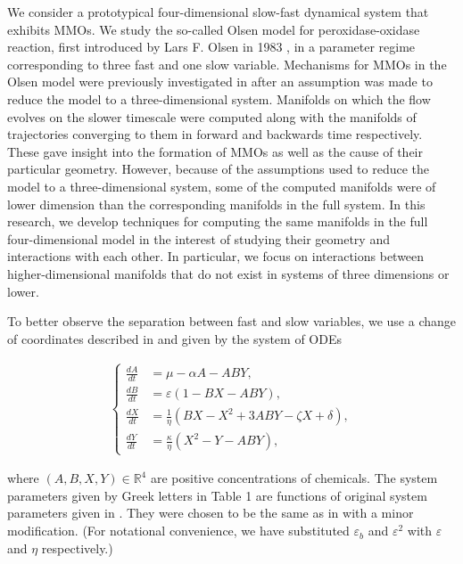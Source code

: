 \documentclass{ws-ijbc}
\begin{document}
We consider a prototypical four-dimensional slow-fast dynamical system that exhibits MMOs.  We study the so-called Olsen model for peroxidase-oxidase reaction, first introduced by Lars F. Olsen in 1983  \cite{Olsen}, in a parameter regime corresponding to three fast and one slow variable.  Mechanisms for MMOs in the Olsen model were previously investigated in \cite{QSSA} after an assumption was made to reduce the model to a three-dimensional system.  Manifolds on which the flow evolves on the slower timescale were computed along with the manifolds of trajectories converging to them in forward and backwards time respectively.  These gave insight into the formation of MMOs as well as the cause of their particular geometry.  However, because of the assumptions used to reduce the model to a three-dimensional system, some of the computed manifolds were of lower dimension than the corresponding manifolds in the full system.  In this research, we develop techniques for computing the same manifolds in the full four-dimensional model in the interest of studying their geometry and interactions with each other.  In particular, we focus on interactions between higher-dimensional manifolds that do not exist in systems of three dimensions or lower.


To better observe the separation between fast and slow variables, we use a change of coordinates described in \cite{Rescaling} and given by the system of ODEs
    
\begin{equation}
\begin{aligned}
\begin{cases}
\frac{dA}{dt} &= \mu - \alpha A - ABY, \\
\frac{dB}{dt} &= \varepsilon(1-BX - ABY), \\
\frac{dX}{dt} &= \frac{1}{\eta}(BX - X^2 +3ABY - \zeta X + \delta), \\
\frac{dY}{dt} &= \frac{\kappa}{\eta}(X^2 - Y - ABY),
\end{cases}
\end{aligned}
\label{equation_1}
\end{equation}
    
\noindent
where $(A, B, X, Y)\in\mathbb{R}^{4}$ are positive concentrations of chemicals.  The system parameters given by Greek letters in Table 1 are functions of original system parameters given in \cite{Olsen}. They were chosen to be the same as in \cite{Rescaling} with a minor modification.  (For notational convenience, we have substituted  $\varepsilon_{b}$ and $\varepsilon^{2}$ with $\varepsilon$ and $\eta$ respectively.)
\end{document}
